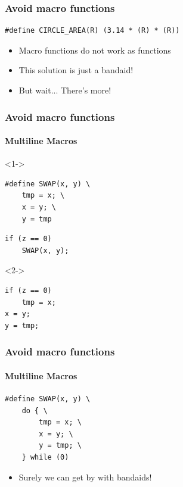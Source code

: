 \documentclass[table]{beamer}
\newcounter{rulecount}
\newcommand{\declarerule}{\textbf{\color{themeblue}{Rule \therulecount:}} }
\begin{document}
\begin{frame}[fragile]
    \frametitle{\declarerule Avoid macro functions}
\begin{lstlisting}[title=\textbf{Macro Solution:} Wrap everything in brackets]
#define CIRCLE_AREA(R) (3.14 * (R) * (R))
\end{lstlisting}
\begin{itemize}
    \item<2->Macro functions do not work as functions
    \item<2->This solution is just a bandaid!
    \item<3->But wait... There's more!
\end{itemize}
\end{frame}

\begin{frame}[fragile]
    \frametitle{\declarerule Avoid macro functions}
    \framesubtitle{Multiline Macros}
    
\begin{uncoverenv}<1->
\begin{lstlisting}[title=A multiline macro that swaps the values of two variables]
#define SWAP(x, y) \
    tmp = x; \
    x = y; \
    y = tmp
\end{lstlisting}

\begin{lstlisting}[title=You write]
if (z == 0)
    SWAP(x, y);
\end{lstlisting}
\end{uncoverenv}

\begin{uncoverenv}<2->
\begin{lstlisting}[title=The compiler sees]
if (z == 0)
    tmp = x;
x = y;
y = tmp;
\end{lstlisting}
\end{uncoverenv}
\end{frame}

\begin{frame}[fragile]
    \frametitle{\declarerule Avoid macro functions}
    \framesubtitle{Multiline Macros}
    
    \begin{lstlisting}[title=\textbf{Bandaid solution:} wrap in do-while]
#define SWAP(x, y) \
    do { \
        tmp = x; \
        x = y; \
        y = tmp; \
    } while (0)
\end{lstlisting}
\begin{itemize}
    \item Surely we can get by with bandaids!
\end{itemize}
\end{frame}
\end{document}
